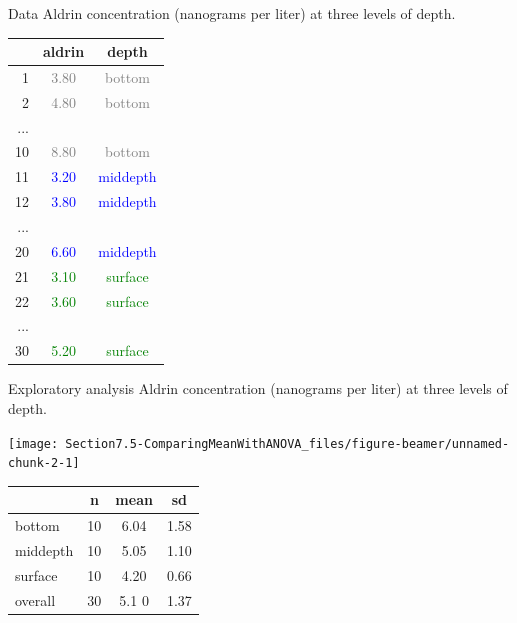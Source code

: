 \documentclass[
  ignorenonframetext,
]{beamer}
\begin{document}
\begin{frame}{Data}
\protect\hypertarget{data}{}
Aldrin concentration (nanograms per liter) at three levels of depth.

\begin{center}
\begin{tabular}{r | c | c}
\hline
    & aldrin                    & depth \\ 
\hline
1   & \textcolor{gray}{3.80}    & \textcolor{gray}{bottom}  \\ 
2   & \textcolor{gray}{4.80}    & \textcolor{gray}{bottom}  \\ 
... &                       & \\
10  & \textcolor{gray}{8.80}    & \textcolor{gray}{bottom} \\
11  & \textcolor{blue}{3.20}        & \textcolor{blue}{middepth}  \\
12  & \textcolor{blue}{3.80}        & \textcolor{blue}{middepth} \\
... &                       & \\
20  & \textcolor{blue}{6.60}        & \textcolor{blue}{middepth} \\
21  & \textcolor{green}{3.10}       & \textcolor{green}{surface} \\
22  & \textcolor{green}{3.60}       & \textcolor{green}{surface} \\
... &                       & \\
30  & \textcolor{green}{5.20}       & \textcolor{green}{surface} \\  
\hline
\end{tabular}
\end{center}
\end{frame}

\begin{frame}{Exploratory analysis}
\protect\hypertarget{exploratory-analysis}{}
Aldrin concentration (nanograms per liter) at three levels of depth.

\begin{center}\texttt{[image: Section7.5-ComparingMeanWithANOVA\_files/figure-beamer/unnamed-chunk-2-1]} \end{center}

\begin{center}
\begin{tabular}{l | c c c}
        & n & mean  & sd        \\
\hline
bottom  & 10    & 6.04  & 1.58 \\
middepth& 10    & 5.05  & 1.10 \\
surface & 10    & 4.20  & 0.66 \\
\hline
overall & 30    & 5.1   0   & 1.37
\end{tabular}
\end{center}
\end{frame}
\end{document}
